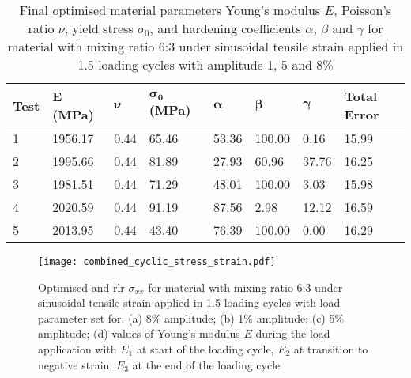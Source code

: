 \begin{table}[h!]
\centering
\caption{Final optimised material parameters Young's modulus $E$, Poisson's ratio $\nu$, yield stress $\sigma_0$, and hardening coefficients $\alpha$, $\beta$ and $\gamma$ for material with mixing ratio 6:3 under sinusoidal tensile strain applied in 1.5 loading cycles with amplitude 1, 5 and 8\%}
\label{tab:cyclicMatParams}
\renewcommand{\arraystretch}{1.1}
\begin{tabular}{L{0.08\textwidth}|C{0.08\textwidth}C{0.08\textwidth}C{0.08\textwidth}C{0.08\textwidth}C{0.08\textwidth}C{0.08\textwidth}C{0.08\textwidth}}
\toprule
\textbf{Test} & \textbf{E (MPa)} & $\boldsymbol{\nu}$ & $\boldsymbol{\sigma_0}$ \textbf{(MPa)} & $\boldsymbol{\alpha}$ & $\boldsymbol{\beta}$ & $\boldsymbol{\gamma}$ & \textbf{Total Error}\\
 & 1956.17 & 0.44 & 65.46 & 53.36 & 100.00 & 0.16 & 15.99\\
2 & 1995.66 & 0.44 & 81.89 & 27.93 & 60.96 & 37.76 & 16.25\\
3 & 1981.51 & 0.44 & 71.29 & 48.01 & 100.00 & 3.03 & 15.98\\
4 & 2020.59 & 0.44 & 91.19 & 87.56 & 2.98 & 12.12 & 16.59\\
5 & 2013.95 & 0.44 & 43.40 & 76.39 & 100.00 & 0.00 & 16.29\\
\bottomrule
\end{tabular}
\end{table}


\begin{figure}
    \centering
    \texttt{[image: combined\_cyclic\_stress\_strain.pdf]}
    \caption{Optimised and \acrfull{rlr} $\sigma_{xx}$ for material with mixing ratio 6:3 under sinusoidal tensile strain applied in 1.5 loading cycles with load parameter set for: (a) 8\% amplitude; (b) 1\% amplitude; (c) 5\% amplitude; (d) values of Young's modulus $E$ during the load application with $E_1$ at start of the loading cycle, $E_2$ at transition to negative strain, $E_3$ at the end of the loading cycle}
    \label{fig:cycliclStressStrain}
\end{figure}
 
